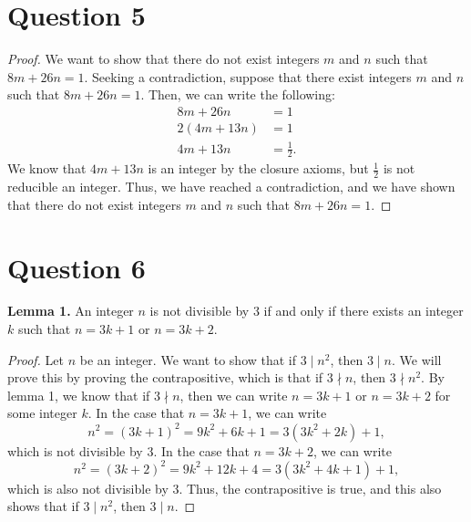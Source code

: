 \documentclass{article}
\begin{document}
\newpage
\section*{Question 5}
\begin{proof}
    We want to show that there do not exist integers $m$ and $n$ such that $8m + 26n = 1$.
    Seeking a contradiction, suppose that there exist integers $m$ and $n$ such that $8m + 26n = 1$.
    Then, we can write the following:
    \begin{align*}
        8m + 26n &= 1 \\
        2(4m + 13n) &= 1 \\
        4m + 13n &= \frac{1}{2}.
    \end{align*}
    We know that $4m + 13n$ is an integer by the closure axioms, but $\frac{1}{2}$ is not reducible an integer.
    Thus, we have reached a contradiction, and we have shown that there do not exist integers $m$ and $n$ such that $8m + 26n = 1$.
\end{proof}

\section*{Question 6}
\textbf{Lemma 1.} An integer $n$ is not divisible by 3 if and only if there exists an integer $k$ such that $n = 3k + 1$ or $n = 3k + 2$.
\begin{proof}
    Let $n$ be an integer.
    We want to show that if $3 \mid n^2$, then $3 \mid n$.
    We will prove this by proving the contrapositive, which is that if $3 \nmid n$, then $3 \nmid n^2$.
    By lemma 1, we know that if $3 \nmid n$, then we can write $n = 3k + 1$ or $n = 3k + 2$ for some integer $k$.
    In the case that $n = 3k + 1$, we can write $$n^2 = (3k + 1)^2 = 9k^2 + 6k + 1 = 3(3k^2 + 2k) + 1,$$ which is not divisible by 3.
    In the case that $n = 3k + 2$, we can write $$n^2 = (3k + 2)^2 = 9k^2 + 12k + 4 = 3(3k^2 + 4k + 1) + 1,$$ which is also not divisible by 3.
    Thus, the contrapositive is true, and this also shows that if $3 \mid n^2$, then $3 \mid n$.
\end{proof}
\end{document}
